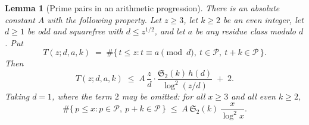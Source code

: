 \documentclass[10pt]{article}
\newtheorem{lemma}{Lemma}
\theoremstyle{definition}
\theoremstyle{remark}
\newcommand{\PP}{\mathcal{P}}
\begin{document}
\begin{lemma}[Prime pairs in an arithmetic progression]\label{lem:sieve}
There is an absolute constant $A$ with the following property. Let $z \ge 3$,
let $k \ge 2$ be an even integer, let $d \ge 1$ be odd and squarefree with
$d \le z^{1/2}$, and let $a$ be any residue class modulo $d$. Put
\[
  T(z; d, a, k) \;=\;
  \#\{\, t \le z : t \equiv a \!\!\pmod d,\ t \in \PP,\ t + k \in \PP \,\}.
\]
Then
\begin{equation}\label{eq:APbound}
  T(z; d, a, k)
  \;\le\; A\,\frac{z}{d}\cdot
    \frac{\mathfrak{S}_2(k)\, h(d)}{\log^{2}(z/d)} \;+\; 2 .
\end{equation}
Taking $d = 1$, where the term $2$ may be omitted: for all $x \ge 3$ and all
even $k \ge 2$,
\begin{equation}\label{eq:twinbound}
  \#\{\, p \le x : p \in \PP,\ p+k \in \PP \,\}
  \;\le\; A\,\mathfrak{S}_2(k)\,\frac{x}{\log^{2} x}.
\end{equation}
\end{lemma}
\end{document}
